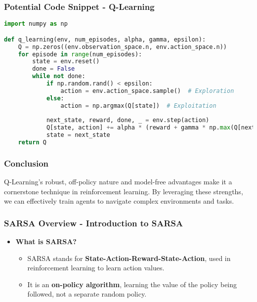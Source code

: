 \documentclass[aspectratio=169]{beamer}
\begin{document}
\begin{frame}[fragile]
    \frametitle{Potential Code Snippet - Q-Learning}
    \begin{lstlisting}[language=Python]
import numpy as np

def q_learning(env, num_episodes, alpha, gamma, epsilon):
    Q = np.zeros((env.observation_space.n, env.action_space.n))
    for episode in range(num_episodes):
        state = env.reset()
        done = False
        while not done:
            if np.random.rand() < epsilon:
                action = env.action_space.sample()  # Exploration
            else:
                action = np.argmax(Q[state])  # Exploitation
            
            next_state, reward, done, _ = env.step(action)
            Q[state, action] += alpha * (reward + gamma * np.max(Q[next_state]) - Q[state, action])
            state = next_state
    return Q
    \end{lstlisting}
\end{frame}

\begin{frame}[fragile]
    \frametitle{Conclusion}
    Q-Learning's robust, off-policy nature and model-free advantages make it a cornerstone technique in reinforcement learning. 
    By leveraging these strengths, we can effectively train agents to navigate complex environments and tasks.
\end{frame}

\begin{frame}[fragile]
    \frametitle{SARSA Overview - Introduction to SARSA}
    \begin{itemize}
        \item \textbf{What is SARSA?}
        \begin{itemize}
            \item SARSA stands for \textbf{State-Action-Reward-State-Action}, used in reinforcement learning to learn action values.
            \item It is an \textbf{on-policy algorithm}, learning the value of the policy being followed, not a separate random policy.
        \end{itemize}
    \end{itemize}
\end{frame}
\end{document}
